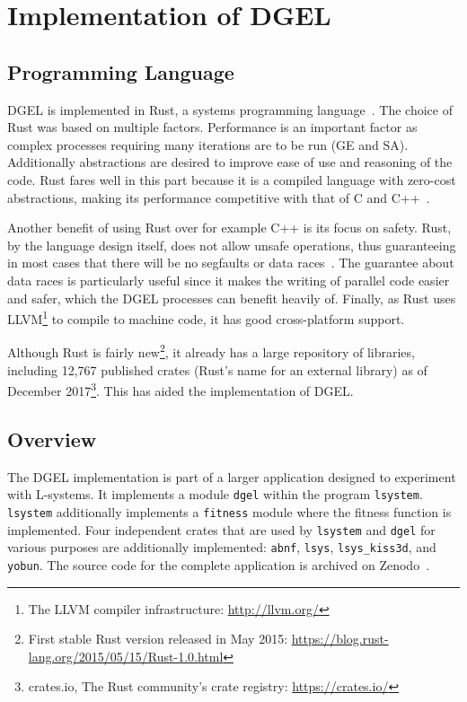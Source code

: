 \chapter[Implementation of DGEL]{Implementation of \gls{DGEL}}
\section{Programming Language}
\gls{DGEL} is implemented in Rust, a systems programming language~\cite{Rust}.
The choice of Rust was based on multiple factors.
Performance is an important factor as complex processes requiring many iterations are to be run (\gls{GE} and \gls{SA}).
Additionally abstractions are desired to improve ease of use and reasoning of the code.
Rust fares well in this part because it is a compiled language with zero-cost abstractions, making its performance competitive with that of C and C++~\cite{RustFaq}.

Another benefit of using Rust over for example C++ is its focus on safety.
Rust, by the language design itself, does not allow unsafe operations, thus guaranteeing in most cases that there will be no segfaults or data races~\cite{RustSafe,Rust,RustRace}.
The guarantee about data races is particularly useful since it makes the writing of parallel code easier and safer, which the \gls{DGEL} processes can benefit heavily of.
Finally, as Rust uses LLVM\footnote{The LLVM compiler infrastructure: \url{http://llvm.org/}} to compile to machine code, it has good cross-platform support.

Although Rust is fairly new\footnote{First stable Rust version released in May 2015: \url{https://blog.rust-lang.org/2015/05/15/Rust-1.0.html}}, it already has a large repository of libraries, including 12,767 published crates (Rust's name for an external library) as of December 2017\footnote{crates.io, The Rust community’s crate registry: \url{https://crates.io/}}.
This has aided the implementation of \gls{DGEL}.

\section{Overview}
The \gls{DGEL} implementation is part of a larger application designed to experiment with \glspl{L-system}.
It implements a module \texttt{dgel} within the program \texttt{lsystem}.
\texttt{lsystem} additionally implements a \texttt{fitness} module where the fitness function is implemented.
Four independent crates that are used by \texttt{lsystem} and \texttt{dgel} for various purposes are additionally implemented: \texttt{abnf}, \texttt{lsys}, \texttt{lsys\_kiss3d}, and \texttt{yobun}.
The source code for the complete application is archived on Zenodo~\cite{CodeLsystem}.


